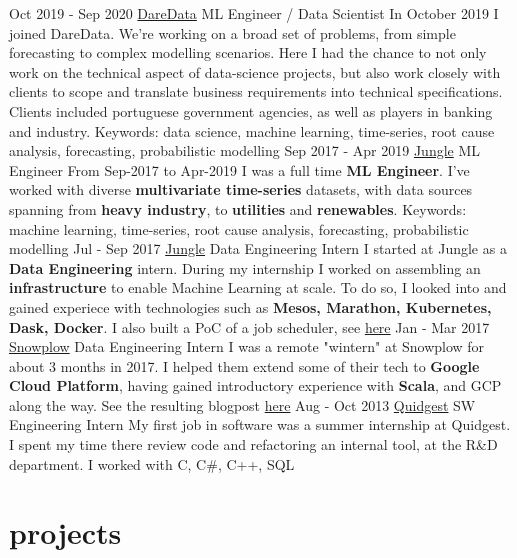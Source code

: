 \documentclass[]{colobas-cv}
\begin{document}
\entry
  {Oct 2019 - Sep 2020}
  {\href{https://daredata.engineering}{DareData}}
  {ML Engineer / Data Scientist}
  {In October 2019 I joined DareData. We're working on a broad set of problems,
  from simple forecasting to complex modelling scenarios. Here I had the chance
  to not only work on the technical aspect of data-science projects, but also
  work closely with clients to scope and translate business requirements into
  technical specifications. Clients included portuguese government agencies,
  as well as players in banking and industry.
  Keywords: data science, machine learning, time-series, root cause analysis, forecasting,
  probabilistic modelling}
\entry
  {Sep 2017 - Apr 2019}
  {\href{https://jungle.ai}{Jungle}}
  {ML Engineer}
  {From Sep-2017 to Apr-2019 I was a full time \textbf{ML Engineer}. I've worked with diverse 
  \textbf{multivariate time-series} datasets, with data sources spanning from 
  \textbf{heavy industry}, to \textbf{utilities} and \textbf{renewables}.
  Keywords: machine learning, time-series, root cause analysis, forecasting,
  probabilistic modelling}
\entry
  {Jul - Sep 2017}
  {\href{https://jungle.ai}{Jungle}}
  {Data Engineering Intern}
  {I started at Jungle as a \textbf{Data Engineering} intern. During my internship I
  worked on assembling an \textbf{infrastructure} to enable Machine Learning at scale.
  To do so, I looked into and gained experiece with technologies such as
  \textbf{Mesos, Marathon, Kubernetes, Dask, Docker}. I also built a PoC of a
  job scheduler, see \href{https://github.com/colobas/obras}{here}}
\entry
  {Jan - Mar 2017}
  {\href{https://snowplowanalytics.com}{Snowplow}}
  {Data Engineering Intern}
  {I was a remote "wintern" at Snowplow for about 3 months in 2017. I helped
  them extend some of their tech to \textbf{Google Cloud Platform}, having gained 
  introductory experience with \textbf{Scala}, and GCP along the way. See the
  resulting blogpost \href{https://snowplowanalytics.com/blog/2017/03/30/google-cloud-dataflow-example-project-released/}{here}}
\entry
  {Aug - Oct 2013}
  {\href{https://quidgest.com}{Quidgest}}
  {SW Engineering Intern}
  {My first job in software was a summer internship at Quidgest. I spent my time
  there review code and refactoring an internal tool, at the R\&D department.
  I worked with C, C\#, C++, SQL}
\clearpage
\section{projects}
\end{document}
